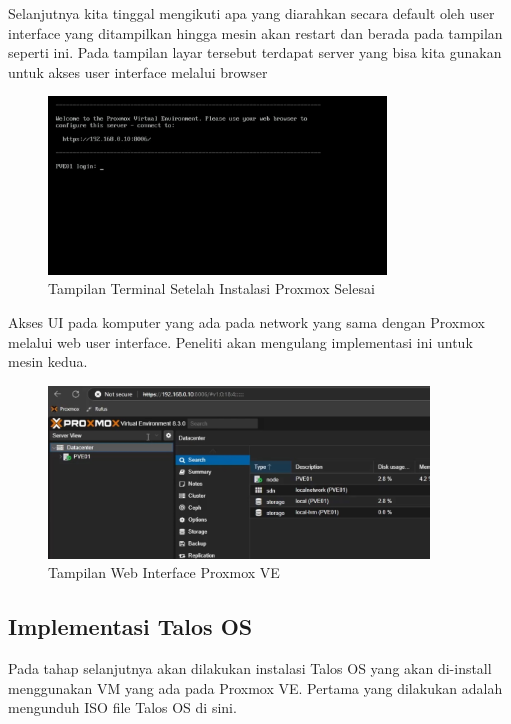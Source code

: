 Selanjutnya kita tinggal mengikuti apa yang diarahkan secara default oleh user interface yang ditampilkan hingga mesin akan restart dan berada pada tampilan seperti ini.
Pada tampilan layar tersebut terdapat server yang bisa kita gunakan untuk akses user interface melalui browser
\begin{figure}[H]
    \centering
    \includegraphics[width=0.8\textwidth]{figures/proxmox-install-terminal-3.jpg}
    \caption{Tampilan Terminal Setelah Instalasi Proxmox Selesai}
    \label{fig:proxmox_terminal}
\end{figure}

Akses UI pada komputer yang ada pada network yang sama dengan Proxmox melalui web user interface.
Peneliti akan mengulang implementasi ini untuk mesin kedua.
\begin{figure}[H]
    \centering
    \includegraphics[width=0.9\textwidth]{figures/proxmox-install-web-ui-4.jpg}
    \caption{Tampilan Web Interface Proxmox VE}
    \label{fig:proxmox_webui}
\end{figure}

\subsection{Implementasi Talos OS}
Pada tahap selanjutnya akan dilakukan instalasi Talos OS yang akan di-install menggunakan VM yang ada pada Proxmox VE.
Pertama yang dilakukan adalah mengunduh ISO file Talos OS di sini.

